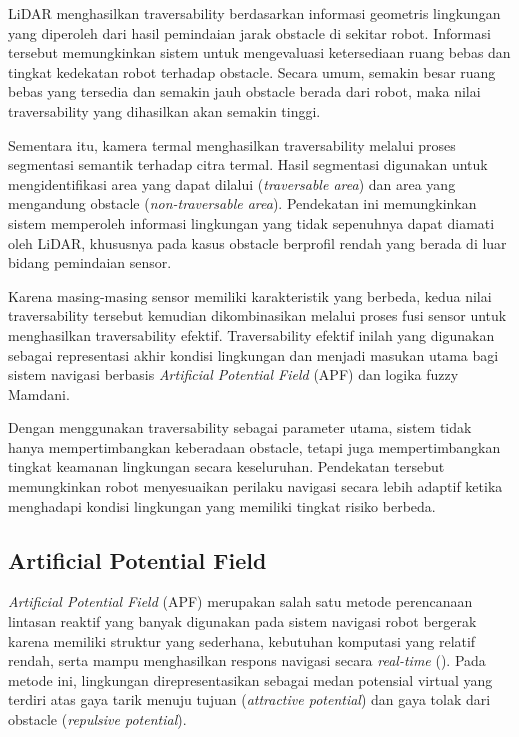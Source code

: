 LiDAR menghasilkan traversability berdasarkan informasi geometris lingkungan yang di\-peroleh dari hasil pemindaian jarak obstacle di sekitar robot. Informasi tersebut memungkinkan sistem untuk mengevaluasi ketersediaan ruang bebas dan tingkat kedekatan robot terhadap obstacle. Secara umum, semakin besar ruang bebas yang tersedia dan semakin jauh obstacle berada dari robot, maka nilai traversability yang dihasilkan akan semakin tinggi.

Sementara itu, kamera termal menghasilkan traversability melalui proses segmentasi semantik terhadap citra termal. Hasil segmentasi digunakan untuk mengidentifikasi area yang dapat dilalui (\textit{traversable area}) dan area yang mengandung obstacle (\textit{non-traversable area}). Pendekatan ini memungkinkan sistem memperoleh informasi lingkungan yang tidak sepenuhnya dapat diamati oleh LiDAR, khususnya pada kasus obstacle berprofil rendah yang berada di luar bidang pemindaian sensor.

Karena masing-masing sensor memiliki karakteristik yang berbeda, kedua nilai traversability tersebut kemudian dikombinasikan melalui proses fusi sensor untuk menghasilkan traver\-sability efektif. Traversability efektif inilah yang digunakan sebagai representasi akhir kondisi lingkungan dan menjadi masukan utama bagi sistem navigasi berbasis \textit{Artificial Potential Field} (APF) dan logika fuzzy Mamdani.

Dengan menggunakan traversability sebagai parameter utama, sistem tidak hanya mempertimbangkan keberadaan obstacle, tetapi juga mempertimbangkan tingkat keamanan lingkungan secara keseluruhan. Pendekatan tersebut memungkinkan robot menyesuaikan perilaku navigasi secara lebih adaptif ketika menghadapi kondisi lingkungan yang memiliki tingkat risiko berbeda.

\subsection{Artificial Potential Field}

\textit{Artificial Potential Field} (APF) merupakan salah satu metode perencanaan lintasan reaktif yang banyak digunakan pada sistem navigasi robot bergerak karena memiliki struktur yang sederhana, kebutuhan komputasi yang relatif rendah, serta mampu menghasilkan respons navigasi secara \textit{real-time} (\cite{Khatib1986,Ge2002}). Pada metode ini, lingkungan direpresentasikan sebagai medan potensial virtual yang terdiri atas gaya tarik menuju tujuan (\textit{attractive potential}) dan gaya tolak dari obstacle (\textit{repulsive potential}).


